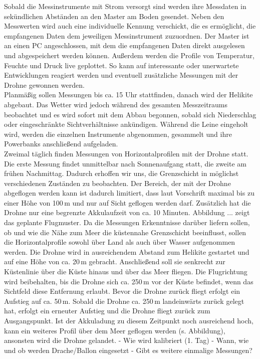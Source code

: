 \documentclass[a4paper,11pt,DIV=calc,tablecaptionabove,headinclude,twoside]{article}
\begin{document}
Sobald die Messinstrumente mit Strom versorgt sind werden ihre Messdaten in sekündlichen Abständen an den Master am Boden gesendet. Neben den Messwerten wird auch eine individuelle Kennung verschickt, die es ermöglicht, die empfangenen Daten dem jeweiligen Messinstrument zuzuordnen. Der Master ist an einen PC angeschlossen, mit dem die empfangenen Daten direkt ausgelesen und abgespeichert werden können. Außerdem werden die Profile von Temperatur, Feuchte und Druck live geplottet. So kann auf interessante oder unerwartete Entwicklungen reagiert werden und eventuell zusätzliche Messungen mit der Drohne gewonnen werden.\\

Planmäßig sollen Messungen bis ca. 15 Uhr stattfinden, danach wird der Helikite abgebaut. Das Wetter wird jedoch während des gesamten Messzeitraums beobachtet und es wird sofort mit dem Abbau begonnen, sobald sich Niederschlag oder eingeschränkte Sichtverhältnisse ankündigen. Während die Leine eingeholt wird, werden die einzelnen Instrumente abgenommen, gesammelt und ihre Powerbanks anschließend aufgeladen. \\

Zweimal täglich finden Messungen von Horizontalprofilen mit der Drohne statt. Die erste Messung findet unmittelbar nach Sonnenaufgang statt, die zweite am frühen Nachmittag. Dadurch erhoffen wir uns, die Grenzschicht in möglichst verschiedenen Zuständen zu beobachten.  
Der Bereich, der mit der Drohne abgeflogen werden kann ist dadurch limitiert, dass laut Vorschrift maximal bis zu einer Höhe von 100\,m und nur auf Sicht geflogen werden darf. Zusätzlich hat die Drohne nur eine begrenzte Akkulaufzeit von ca. 10 Minuten. Abbildung ... zeigt das geplante Flugmuster. Da die Messungen Erkenntnisse darüber liefern sollen, ob und wie die Nähe zum Meer die küstennahe Grenzschicht beeinflusst, sollen die Horizontalprofile sowohl über Land als auch über Wasser aufgenommen werden.
Die Drohne wird in ausreichendem Abstand zum Helikite gestartet und auf eine Höhe von ca. 20\,m gebracht. Anschließend soll sie senkrecht zur Küstenlinie über die Küste hinaus und über das Meer fliegen. Die Flugrichtung wird beibehalten, bis die Drohne sich ca. 250\,m vor der Küste befindet, wenn das Sichtfeld diese Entfernung erlaubt. Bevor die Drohne zurück fliegt erfolgt ein Aufstieg auf ca. 50\,m. Sobald die Drohne ca. 250\,m landeinwärts zurück gelegt hat, erfolgt ein erneuter Aufstieg und die Drohne fliegt zurück zum Ausgangspunkt. Ist der Akkuladung zu diesem Zeitpunkt noch ausreichend hoch, kann ein weiteres Profil über dem Meer geflogen werden (s. Abbildung), ansonsten wird die Drohne gelandet.   
- Wie wird kalibriert (1. Tag)
- Wann, wie und ob werden Drache/Ballon eingesetzt
- Gibt es weitere einmalige Messungen?
\end{document}
